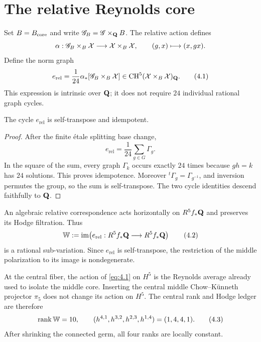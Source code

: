 \section{The relative Reynolds core}
\label{sec:relative}

Set \(B=B_{\mathrm{core}}\) and write \(\mathscr G_B=\mathscr G\times_\mathbf Q B\).  The
relative action defines
\[
\alpha:\mathscr G_B\times_B\mathcal X
\longrightarrow\mathcal X\times_B\mathcal X,\qquad
(g,x)\longmapsto(x,gx).
\]
Define the norm graph
\[
 e_{\mathrm{rel}}
 =\frac1{24}\alpha_*[\mathscr G_B\times_B\mathcal X]
 \in\operatorname{CH}^5(\mathcal X\times_B\mathcal X)_\mathbf Q.        \tag{4.1}
\label{eq:4.1}
\]
This expression is intrinsic over \(\mathbf Q\); it does not require \(24\)
individual rational graph cycles.

\begin{proposition}
\label{prop:relative-projector}
The cycle \(e_{\mathrm{rel}}\) is self-transpose and idempotent.
\end{proposition}

\begin{proof}
After the finite \'etale splitting base change,
\[
 e_{\mathrm{rel}}=\frac1{24}\sum_{g\in G}\Gamma_g.
\]
In the square of the sum, every graph \(\Gamma_k\) occurs exactly \(24\)
times because \(gh=k\) has \(24\) solutions.  This proves idempotence.
Moreover \({}^t\Gamma_g=\Gamma_{g^{-1}}\), and inversion permutes the group,
so the sum is self-transpose.  The two cycle identities descend faithfully
to \(\mathbf Q\).
\end{proof}

An algebraic relative correspondence acts horizontally on
\(R^5f_*\mathbf Q\) and preserves its Hodge filtration.  Thus
\[
 \mathbb W:=\operatorname{im}\!\left(
 e_{\mathrm{rel}}:R^5f_*\mathbf Q\longrightarrow R^5f_*\mathbf Q
 \right)                                           \tag{4.2}
\]
is a rational sub-variation.  Since \(e_{\mathrm{rel}}\) is
self-transpose, the restriction of the middle polarization to its image is
nondegenerate.

At the central fiber, the action of \cref{eq:4.1} on \(H^5\) is the
Reynolds average already used to isolate the middle core.  Inserting the
central middle Chow--K\"unneth projector \(\pi_5\) does not change its action
on \(H^5\).  The central rank and Hodge ledger are therefore
\[
 \operatorname{rank}\mathbb W=10,\qquad
 (h^{4,1},h^{3,2},h^{2,3},h^{1,4})=(1,4,4,1).
                                                               \tag{4.3}
\]
After shrinking the connected germ, all four ranks are locally constant.

